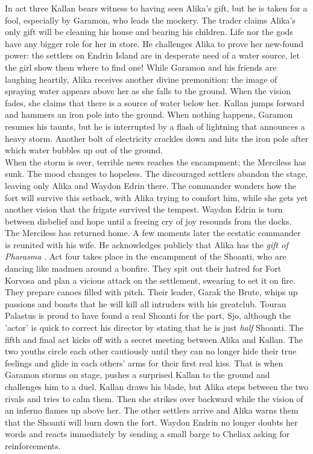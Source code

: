 In act three Kallan bears witness to having seen Alika's gift, but he is taken for a fool, especially by Garamon, who leads the mockery. The trader claims Alika's only gift will be cleaning his house and bearing his children. Life nor the gods have any bigger role for her in store. He challenges Alika to prove her new-found power: the settlers on Endrin Island are in desperate need of a water source, let the girl show them where to find one! While Garamon and his friends are laughing heartily, Alika receives another divine premonition: the image of spraying water appears above her as she falls to the ground. When the vision fades, she claims that there is a source of water below her. Kallan jumps forward and hammers an iron pole into the ground. When nothing happens, Garamon resumes his taunts, but he is interrupted by a flash of lightning that announces a heavy storm. Another bolt of electricity crackles down and hits the iron pole after which water bubbles up out of the ground.\\

When the storm is over, terrible news reaches the encampment; the Merciless has sunk. The mood changes to hopeless. The discouraged settlers abandon the stage, leaving only Alika and Waydon Edrin there. The commander wonders how the fort will survive this setback, with Alika trying to comfort him, while she gets yet another vision that the frigate survived the tempest. Waydon Edrin is torn between disbelief and hope until a freeing cry of joy resounds from the docks. The Merciless has returned home. A few moments later the ecstatic commander is reunited with his wife. He acknowledges publicly that Alika has the {\itshape gift of Pharasma} . Act four takes place in the encampment of the Shoanti, who are dancing like madmen around a bonfire. They spit out their hatred for Fort Korvosa and plan a vicious attack on the settlement, swearing to set it on fire. They prepare canoes filled with pitch. Their leader, Garak the Brute, whips up passions and boasts that he will kill all intruders with his greatclub. Touran Palastus is proud to have found a real Shoanti for the part, Sjo, although the 'actor' is quick to correct his director by stating that he is just {\itshape half} Shoanti. The fifth and final act kicks off with a secret meeting between Alika and Kallan. The two youths circle each other cautiously until they can no longer hide their true feelings and glide in each others' arms for their first real kiss. That is when Garamon storms on stage, pushes a surprised Kallan to the ground and challenges him to a duel. Kallan draws his blade, but Alika steps between the two rivals and tries to calm them. Then she strikes over backward while the vision of an inferno flames up above her. The other settlers arrive and Alika warns them that the Shoanti will burn down the fort. Waydon Endrin no longer doubts her words and reacts immediately by sending a small barge to Cheliax asking for reinforcements.\\


